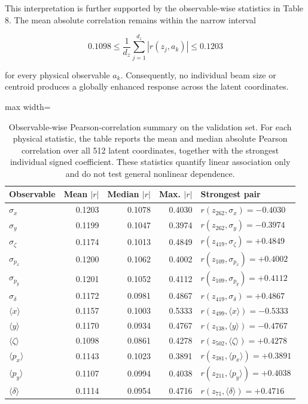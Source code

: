 This interpretation is further supported by the observable-wise statistics in Table 8. The mean absolute correlation remains within the narrow interval

\[
0.1098\le\frac1{d_z}\sum_{j=1}^{d_z}|r(z_j,a_k)|\le0.1203
\]





for every physical observable \(a_{k} .\) Consequently, no individual beam size or centroid produces a globally enhanced response across the latent coordinates.

\begin{table}[!htbp]
\centering\small
\caption{Observable-wise Pearson-correlation summary on the validation set. For each physical statistic, the table reports the mean and median absolute Pearson correlation over all 512 latent coordinates, together with the strongest individual signed coefficient. These statistics quantify linear association only and do not test general nonlinear dependence.}
\label{tab:8}
\begin{adjustbox}{max width=\linewidth}
\begin{tabular}{lrrrl}\toprule
Observable & Mean $|r|$ & Median $|r|$ & Max. $|r|$ & Strongest pair\\\midrule
$\sigma_x$ & 0.1203 & 0.1078 & 0.4030 & $r(z_{262},\sigma_x)=-0.4030$\\
$\sigma_y$ & 0.1199 & 0.1047 & 0.3974 & $r(z_{262},\sigma_y)=-0.3974$\\
$\sigma_{\zeta}$ & 0.1174 & 0.1013 & 0.4849 & $r(z_{419},\sigma_{\zeta})=+0.4849$\\
$\sigma_{p_x}$ & 0.1200 & 0.1062 & 0.4002 & $r(z_{109},\sigma_{p_x})=+0.4002$\\
$\sigma_{p_y}$ & 0.1201 & 0.1052 & 0.4112 & $r(z_{109},\sigma_{p_y})=+0.4112$\\
$\sigma_{\delta}$ & 0.1172 & 0.0981 & 0.4867 & $r(z_{419},\sigma_{\delta})=+0.4867$\\
$\langle x\rangle$ & 0.1157 & 0.1003 & 0.5333 & $r(z_{499},\langle x\rangle)=-0.5333$\\
$\langle y\rangle$ & 0.1170 & 0.0934 & 0.4767 & $r(z_{138},\langle y\rangle)=-0.4767$\\
$\langle\zeta\rangle$ & 0.1098 & 0.0861 & 0.4278 & $r(z_{502},\langle\zeta\rangle)=+0.4278$\\
$\langle p_x\rangle$ & 0.1143 & 0.1023 & 0.3891 & $r(z_{381},\langle p_x\rangle)=+0.3891$\\
$\langle p_y\rangle$ & 0.1107 & 0.0994 & 0.4038 & $r(z_{211},\langle p_y\rangle)=+0.4038$\\
$\langle\delta\rangle$ & 0.1114 & 0.0954 & 0.4716 & $r(z_{71},\langle\delta\rangle)=+0.4716$\\\bottomrule\end{tabular}
\end{adjustbox}
\end{table}

